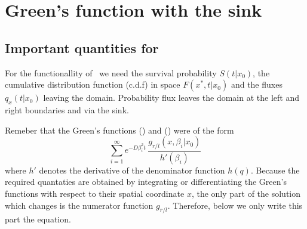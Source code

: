 
\section{Green's function with the sink}

\subsection{ Important quantities for \GFRD}

For the functionallity of \GFRD\, we need the survival probability $S(t|x_0)$, the cumulative distribution function (c.d.f) in space $F(x^*,t|x_0)$ and the fluxes $q_x(t|x_0)$ leaving the domain. Probability flux leaves the domain at the left and right boundaries and via the sink.

Remeber that the Green's functions () and () were of the form
\begin{equation} 
 \sum_{i=1}^{\infty} e^{-D \beta_i ^2 t} \, \frac{g_{r/l}(x, \beta_i |x_0)}{ h'(\beta_i)}
\end{equation}
where $h'$ denotes the derivative of the denominator function $h(q)$. Because the required quantaties are obtained by integrating or differentiating the Green's functions with respect to their spatial coordinate $x$, the only part of the solution which changes is the numerator function $g_{r/l}$. Therefore, below we only write this part the equation.

